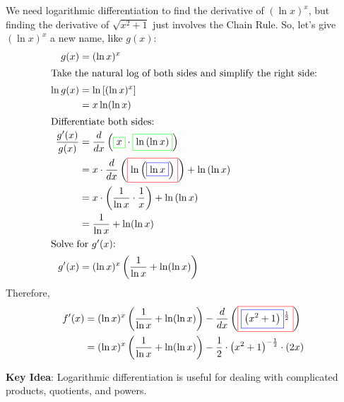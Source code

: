 \documentclass[main]{subfiles}
\begin{document}
\begin{enumerate}[resume]
\begin{enumerate}
    \begin{solution}
      We need logarithmic differentiation to find the derivative of $(\ln
      x)^x$, but finding the derivative of $\sqrt{x^2 + 1}$ just involves
      the Chain Rule.  So, let's give $(\ln x)^x$ a new name, like $g(x)$:
      \begin{align*}
        g(x) &= (\ln x)^x \\
        \intertext{Take the natural log of both sides and simplify the
          right side:}
        \ln g(x) &= \ln \left[ (\ln x)^x \right] \\
        &= x \ln (\ln x) \\
        \intertext{Differentiate both sides:} %
        \frac{g'(x)}{g(x)} &=
        \frac{d}{dx} \left(\fcolorbox{green}{white}{$\displaystyle
            x$}\cdot \fcolorbox{green}{white}{$\displaystyle  \ln\left(\ln
              x\right)$}\right) \\
        &= x\cdot \frac{d}{dx} \left(\fcolorbox{red}{white}{$\displaystyle
            \ln\left(\fcolorbox{blue}{white}{$\displaystyle \ln
                x$}\right)$}\right)+ \ln\left(\ln x\right) \\ 
        &= x\cdot \left(\frac{1}{\ln x}\cdot \frac{1}{x}\right)+
        \ln\left(\ln x\right) \\
        &= \frac{1}{\ln x} + \ln(\ln x)\\
        \intertext{Solve for $g'(x)$:} g'(x) &= (\ln x)^x \left(
          \frac{1}{\ln x} +\ln(\ln x) \right)
      \end{align*}
      Therefore,
      \begin{align*}
        f'(x) = {} & (\ln x)^x \left(
          \frac{1}{\ln x} +\ln(\ln x) \right) - \frac{d}{dx}
        \left(\fcolorbox{red}{white}{$\displaystyle
            \fcolorbox{blue}{white}{$\displaystyle  \left(x^ { 2} +
                1\right)$}^ { \frac{1}{2}} $}\right) \\
        = {} & (\ln x)^x \left(
          \frac{1}{\ln x} +\ln(\ln x) \right) - \frac{1}{2}\cdot \left(x^
          { 2} + 1\right)^ { -\frac{1}{2}} \cdot \left(2 x\right) 
      \end{align*}
    \end{solution}

  \end{enumerate}

\end{enumerate}

\textbf{Key Idea}: Logarithmic differentiation is useful for dealing with complicated products, quotients, and powers.
\end{document}
